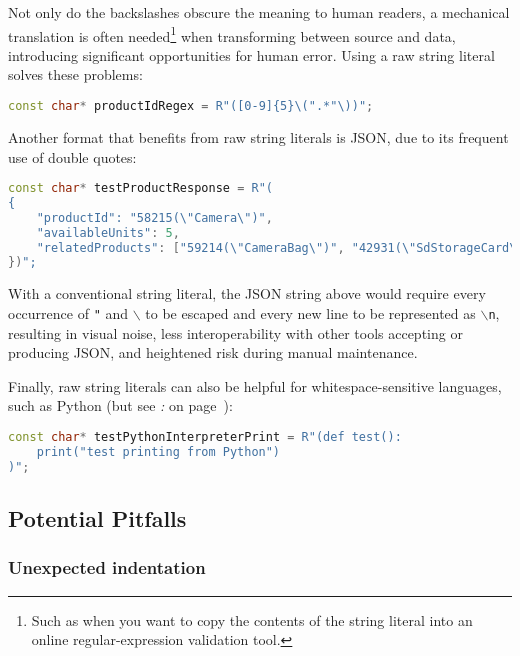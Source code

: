 \noindent Not only do the backslashes obscure the meaning to human readers, a
mechanical translation is often needed{\cprotect\footnote{Such as when
you want to copy the contents of the string literal into an online
  regular-expression validation tool.}} when transforming between source
and data, introducing significant opportunities for human error. Using a
raw string literal solves these problems:

\begin{lstlisting}[language=C++]
const char* productIdRegex = R"([0-9]{5}\(".*"\))";
\end{lstlisting}

\noindent Another format that benefits from raw string literals is JSON, due to
its frequent use of double quotes:

\begin{lstlisting}[language=C++]
const char* testProductResponse = R"(
{
    "productId": "58215(\"Camera\")",
    "availableUnits": 5,
    "relatedProducts": ["59214(\"CameraBag\")", "42931(\"SdStorageCard\")"]
})";
\end{lstlisting}

\noindent With a conventional string literal, the JSON string above would require
every occurrence of \texttt{"} and \texttt{$\backslash$} to be escaped
and every new line to be represented as \texttt{$\backslash$n}, resulting
in visual noise, less interoperability with other tools accepting or
producing JSON, and heightened risk during manual maintenance.

Finally, raw string literals can also be helpful for
whitespace-sensitive languages, such as Python (but see \textit{: } on page~\pageref{encoding-of-newlines-and-whitespace}):

\begin{lstlisting}[language=C++]
const char* testPythonInterpreterPrint = R"(def test():
    print("test printing from Python")
)";
\end{lstlisting}


\subsection[Potential Pitfalls]{Potential Pitfalls}\label{potential-pitfalls-rawstringliteral}

\subsubsection[Unexpected indentation]{Unexpected indentation}\label{unexpected-indentation}

